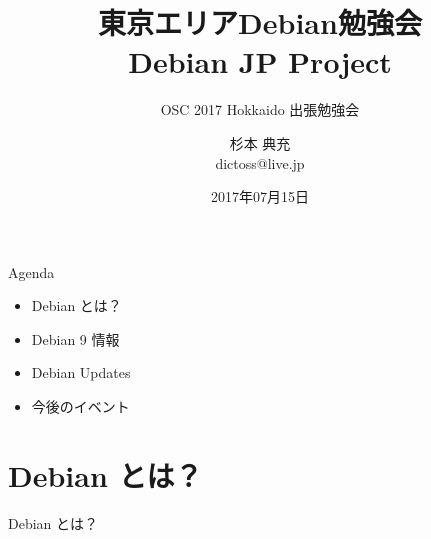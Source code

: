 \title{東京エリアDebian勉強会\\Debian JP Project}
\subtitle{OSC 2017 Hokkaido 出張勉強会}
\author{杉本 典充\\ dictoss@live.jp}
\date{2017年07月15日}



\begin{frame}
\titlepage{}
\end{frame}

\begin{frame}{Agenda}
  \begin{itemize}
  \item Debian とは？
  \item Debian 9 情報
  \item Debian Updates
  \item 今後のイベント
  \end{itemize}
\end{frame}


\section{Debian とは？}
\begin{frame}\begin{center}\Huge{Debian とは？}\end{center}\end{frame}


